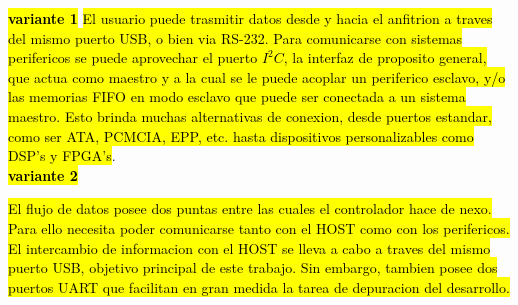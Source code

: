 
\textbf{\hl{variante 1}}
\hl{El usuario puede trasmitir datos desde y hacia el anfitrion a traves del mismo puerto USB, o bien via RS-232. Para comunicarse con sistemas perifericos se puede aprovechar el puerto $I^2C$, la interfaz de proposito general, que actua como maestro y a la cual se le puede acoplar un periferico esclavo, y/o las memorias FIFO en modo esclavo que puede ser conectada a un sistema maestro. Esto brinda muchas alternativas de conexion, desde puertos estandar, como ser ATA, PCMCIA, EPP, etc. hasta dispositivos personalizables como DSP's y FPGA's}.\\

%
%

\textbf{\hl{variante 2}}

\hl{El flujo de datos posee dos puntas entre las cuales el controlador hace de nexo. Para ello necesita poder comunicarse tanto con el HOST como con los perifericos.}\\

\hl{El intercambio de informacion con el HOST se lleva a cabo a traves del mismo puerto USB, objetivo principal de este trabajo. Sin embargo, tambien posee dos puertos UART que facilitan en gran medida la tarea de depuracion del desarrollo.}\\

